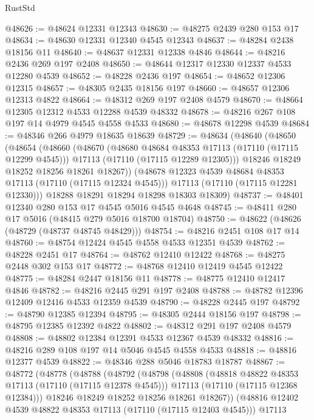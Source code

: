 \begin{lexlean}{RustStd}
\begin{coremodule}
@48626 := @48624 @12331 @12343
@48630 := @48275 @2439 @280 @153 @17
@48634 := @48630 @12331 @12340 @4545 @12343
@48637 := @48284 @2438 @18156 @11
@48640 := @48637 @12331 @12338 @4846
@48644 := @48216 @2436 @269 @197 @2408
@48650 := @48644 @12317 @12330 @12337 @4533 @12280 @4539
@48652 := @48228 @2436 @197
@48654 := @48652 @12306 @12315
@48657 := @48305 @2435 @18156 @197
@48660 := @48657 @12306 @12313 @4822
@48664 := @48312 @269 @197 @2408 @4579
@48670 := @48664 @12305 @12312 @4533 @12288 @4539 @48332
@48678 := @48216 @267 @108 @197 @14 @4979 @4545 @4558 @4533
@48680 := @48678 @12298 @4539
@48684 := @48346 @266 @4979 @18635 @18639
@48729 := @48634
    (@48640
      (@48650
        (@48654
          (@48660
            (@48670
              (@48680 @48684 @48353 @17113 (@17110 (@17115 @12299 @4545)))
              @17113
              (@17110 (@17115 @12289 @12305)))
            @18246
            @18249
            @18252
            @18256
            @18261
            @18267))
        (@48678 @12323 @4539 @48684 @48353 @17113 (@17110 (@17115 @12324 @4545)))
        @17113
        (@17110 (@17115 @12281 @12330)))
      @18288
      @18291
      @18294
      @18298
      @18303
      @18309)
@48737 := @48401 @12340 @280 @153 @17 @4545 @5016 @4545 @4648
@48745 := @48411 @280 @17 @5016 (@48415 @279 @5016 @18700 @18704)
@48750 := @48622 (@48626 (@48729 (@48737 @48745 @48429)))
@48754 := @48216 @2451 @108 @17 @14
@48760 := @48754 @12424 @4545 @4558 @4533 @12351 @4539
@48762 := @48228 @2451 @17
@48764 := @48762 @12410 @12422
@48768 := @48275 @2448 @302 @153 @17
@48772 := @48768 @12410 @12419 @4545 @12422
@48775 := @48284 @2447 @18156 @11
@48778 := @48775 @12410 @12417 @4846
@48782 := @48216 @2445 @291 @197 @2408
@48788 := @48782 @12396 @12409 @12416 @4533 @12359 @4539
@48790 := @48228 @2445 @197
@48792 := @48790 @12385 @12394
@48795 := @48305 @2444 @18156 @197
@48798 := @48795 @12385 @12392 @4822
@48802 := @48312 @291 @197 @2408 @4579
@48808 := @48802 @12384 @12391 @4533 @12367 @4539 @48332
@48816 := @48216 @289 @108 @197 @14 @5046 @4545 @4558 @4533
@48818 := @48816 @12377 @4539
@48822 := @48346 @288 @5046 @18783 @18787
@48867 := @48772
    (@48778
      (@48788
        (@48792
          (@48798
            (@48808
              (@48818 @48822 @48353 @17113 (@17110 (@17115 @12378 @4545)))
              @17113
              (@17110 (@17115 @12368 @12384)))
            @18246
            @18249
            @18252
            @18256
            @18261
            @18267))
        (@48816 @12402 @4539 @48822 @48353 @17113 (@17110 (@17115 @12403 @4545)))
        @17113

\end{coremodule}
\end{lexlean}
